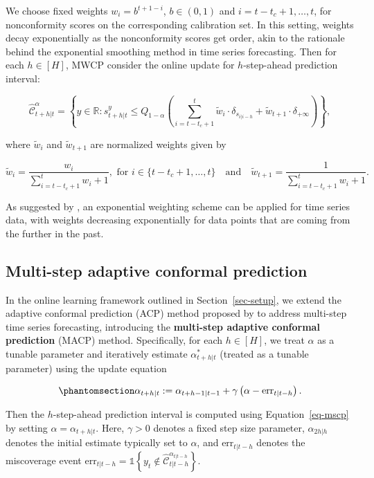 \documentclass[
  11pt,
  a4paper,
]{article}
\theoremstyle{plain}
\theoremstyle{remark}
\begin{document}
We choose fixed weights \(w_i = b^{t+1-i}\), \(b \in (0, 1)\) and
\(i=t-t_c+1,\ldots,t\), for nonconformity scores on the corresponding
calibration set. In this setting, weights decay exponentially as the
nonconformity scores get order, akin to the rationale behind the
exponential smoothing method in time series forecasting. Then for each
\(h \in [H]\), MWCP consider the online update for \(h\)-step-ahead
prediction interval:

\[
\hat{\mathcal{C}}_{t+h|t}^{\alpha} = \left\{y\in\mathbb{R}: s_{t+h|t}^{y} \leq Q_{1-\alpha}\left(\sum_{i=t-t_c+1}^{t}\tilde{w}_i\cdot\delta_{s_{i|i-h}}+\tilde{w}_{t+1}\cdot\delta_{+\infty}\right)\right\},
\]

where \(\tilde{w}_i\) and \(\tilde{w}_{t+1}\) are normalized weights
given by

\[
\tilde{w}_i = \frac{w_i}{\sum_{i=t-t_c+1}^{t}w_i+1}, \text{ for } i \in \{t-t_c+1,\ldots,t\} \quad \text{and} \quad \tilde{w}_{t+1} =  \frac{1}{\sum_{i=t-t_c+1}^{t}w_i+1}.
\]

As suggested by \textcite{barber2023}, an exponential weighting scheme
can be applied for time series data, with weights decreasing
exponentially for data points that are coming from the further in the
past.

\subsection{Multi-step adaptive conformal
prediction}\label{multi-step-adaptive-conformal-prediction}

In the online learning framework outlined in Section~\ref{sec-setup}, we
extend the adaptive conformal prediction (ACP) method proposed by
\textcite{gibbs2021} to address multi-step time series forecasting,
introducing the \textbf{multi-step adaptive conformal prediction} (MACP)
method. Specifically, for each \(h \in [H]\), we treat \(\alpha\) as a
tunable parameter and iteratively estimate \(\alpha_{t+h|t}^{*}\)
(treated as a tunable parameter) using the update equation

\begin{equation}\phantomsection\label{eq-macp}{
\alpha_{t+h|t} := \alpha_{t+h-1|t-1} + \gamma\left(\alpha - \mathrm{err}_{t|t-h}\right).
}\end{equation}

Then the \(h\)-step-ahead prediction interval is computed using
Equation~\ref{eq-mscp} by setting \(\alpha = \alpha_{t+h|t}\). Here,
\(\gamma > 0\) denotes a fixed step size parameter, \(\alpha_{2h|h}\)
denotes the initial estimate typically set to \(\alpha\), and
\(\mathrm{err}_{t|t-h}\) denotes the miscoverage event
\(\mathrm{err}_{t|t-h} = \mathbb{1}\left\{y_t \notin \hat{\mathcal{C}}_{t|t-h}^{\alpha_{t|t-h}}\right\}\).
\end{document}
